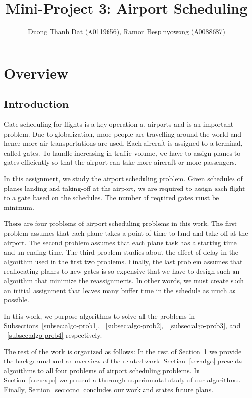 \documentclass[11pt,a4paper]{article}
\author{Duong Thanh Dat (A0119656), Ramon Bespinyowong (A0088687)}
\title{Mini-Project 3: Airport Scheduling}
\begin{document}
\maketitle



\section{Overview}
\label{sec:over}

\subsection{Introduction}
\label{subesc:over-intr}
Gate scheduling for flights is a key operation at airports and is an important problem. Due to globalization, more people are travelling around the world and hence more air transportations are used. Each aircraft is assigned to a terminal, called gates. To handle increasing in traffic volume, we have to assign planes to gates efficiently so that the airport can take more aircraft or more passengers. \par
In this assignment, we study the airport scheduling problem. Given schedules of planes landing and taking-off at the airport, we are required to assign each flight to a gate based on the schedules. The number of required gates must be minimum. \par
There are four problems of airport scheduling problems in this work. The first problem assumes that each plane takes a point of time to land and take off at the airport. The second problem assumes that each plane task has a starting time and an ending time. The third problem studies about the effect of delay in the algorithm used in the first two problems. Finally, the last problem assumes that reallocating planes to new gates is so expensive that we have to design such an algorithm that minimize the reassignments. In other words, we must create such an initial assignment that leaves many buffer time in the schedule as much as possible.  \par
In this work, we purpose algorithms to solve all the problems in Subsections~\ref{subsec:algo-prob1}, ~\ref{subsec:algo-prob2}, ~\ref{subsec:algo-prob3}, and ~\ref{subsec:algo-prob4} respectively. \par
The rest of the work is organized as follows: In the rest of Section~\ref{sec:over} we provide the background and an overview of the related work. Section~\ref{sec:algo} presents algorithms to all four problems of airport scheduling problems. In Section~\ref{sec:expe} we present a thorough experimental study of our algorithms. Finally, Section~\ref{sec:conc} concludes our work and states future plans. \par
\end{document}
